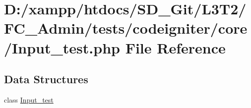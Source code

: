 \hypertarget{_admin_2tests_2codeigniter_2core_2_input__test_8php}{}\section{D\+:/xampp/htdocs/\+S\+D\+\_\+\+Git/\+L3\+T2/\+F\+C\+\_\+\+Admin/tests/codeigniter/core/\+Input\+\_\+test.php File Reference}
\label{_admin_2tests_2codeigniter_2core_2_input__test_8php}
\subsection*{Data Structures}
\begin{DoxyCompactItemize}
\item 
class \hyperlink{class_input__test}{Input\+\_\+test}
\end{DoxyCompactItemize}
